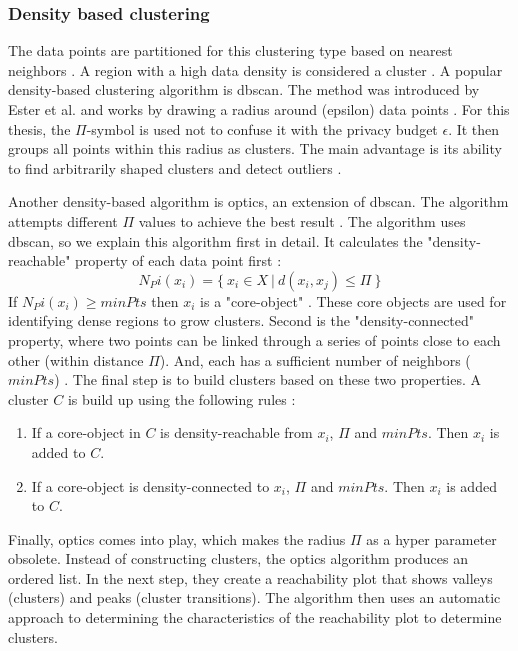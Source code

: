 
\subsubsection{Density based clustering}
The data points are partitioned for this clustering type based on nearest neighbors \citep{fahad_survey_2014}.
A region with a high data density is considered a cluster \citep{xu_comprehensive_2015}.
A popular density-based clustering algorithm is \gls{dbscan}.
The method was introduced by Ester et al. and works by drawing a radius around (epsilon) data points \citep{ester_density-based_nodate}.
For this thesis, the $\Pi$-symbol is used not to confuse it with the privacy budget $\epsilon$.
It then groups all points within this radius as clusters.
The main advantage is its ability to find arbitrarily shaped clusters and detect outliers \citep{liu_privacy_2012}.

Another density-based algorithm is \gls{optics}, an extension of \gls{dbscan}.
The algorithm attempts different $\Pi$ values to achieve the best result \citep{ankerst_optics_nodate}.
The algorithm uses \gls{dbscan}, so we explain this algorithm first in detail.
It calculates the "density-reachable" property of each data point first \citep{ankerst_optics_nodate}:
\begin{equation}
  N_Pi(x_i) = \{ \ x_i \in X \ | \ d(x_i, x_j) \leq \Pi \ \}
\end{equation}
If $N_Pi(x_i) \geq minPts$ then $x_i$ is a "core-object" \citep{ankerst_optics_nodate}.
These core objects are used for identifying dense regions to grow clusters.
Second is the "density-connected" property, where two points can be linked through a series of points close to each other (within distance $\Pi$).
And, each has a sufficient number of neighbors ($minPts$) \citep{ankerst_optics_nodate}.
The final step is to build clusters based on these two properties.
A cluster $C$ is build up using the following rules \citep{ankerst_optics_nodate}:
\begin{enumerate}
  \item If a core-object in $C$ is density-reachable from $x_i$, $\Pi$ and $minPts$. Then $x_i$ is added to $C$.
  \item If a core-object is density-connected to $x_i$, $\Pi$ and $minPts$. Then $x_i$ is added to $C$.
\end{enumerate}
Finally, \gls{optics} comes into play, which makes the radius $\Pi$ as a hyper parameter obsolete.
Instead of constructing clusters, the \gls{optics} algorithm produces an ordered list.
In the next step, they create a reachability plot that shows valleys (clusters) and peaks (cluster transitions).
The algorithm then uses an automatic approach to determining the characteristics of the reachability plot to determine clusters.

